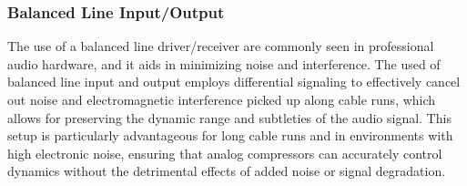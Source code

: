 \documentclass[10pt]{article}
\begin{document}
\begin{multicols*}{2}
                    \noindent
                    \begin{minipage}{\linewidth}

                        \centering


                        \label{fig:pwr-mng}

                    \end{minipage}

                \subsubsection{Balanced Line Input/Output}
                    The use of a balanced line driver/receiver are commonly seen in professional audio hardware, and it aids in minimizing noise and interference. The used of balanced line input and output employs differential signaling to effectively cancel out noise and electromagnetic interference picked up along cable runs, which allows  for preserving the dynamic range and subtleties of the audio signal. This setup is particularly advantageous for long cable runs and in environments with high electronic noise, ensuring that analog compressors can accurately control dynamics without the detrimental effects of added noise or signal degradation.\par


\end{multicols*}
\end{document}
